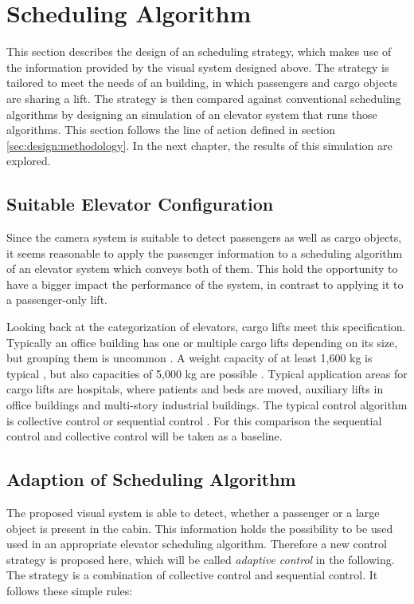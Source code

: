 \section{Scheduling Algorithm}
This section describes the design of an scheduling strategy, 
which makes use of the information provided by the visual system designed above.
The strategy is tailored to meet the needs of an building, in which passengers and cargo objects are sharing a lift.
The strategy is then compared against conventional scheduling algorithms by designing an simulation of an elevator system that runs those algorithms.
This section follows the line of action defined in section \ref{sec:design:methodology}.
In the next chapter, the results of this simulation are explored.

\subsection{Suitable Elevator Configuration}
Since the camera system is suitable to detect passengers as well as cargo objects,
it seems reasonable to apply the passenger information 
to a scheduling algorithm of an elevator system which conveys both of them.
This hold the opportunity to have a bigger impact the performance of the system, 
in contrast to applying it to a passenger-only lift.

Looking back at the categorization of elevators, cargo lifts meet this specification.
Typically an office building has one or multiple cargo lifts depending on its size,
but grouping them is uncommon \autocite[][p.~167]{barney2016handbook}.
A weight capacity of at least 1,600 kg is typical \autocite[][p.~167]{barney2016handbook},
but also capacities of 5,000 kg are possible \autocite[][]{kone2017overview}.
Typical application areas for cargo lifts are hospitals, where patients and beds are moved,
auxiliary lifts in office buildings and multi-story industrial buildings.
The typical control algorithm is collective control or sequential control \autocite[][pp.~238,~244]{barney2016handbook}.
For this comparison the sequential control and collective control will be taken as a baseline.

\subsection{Adaption of Scheduling Algorithm}
The proposed visual system is able to detect, whether a passenger or a large object is present in the cabin.
This information holds the possibility to be used used in an appropriate elevator scheduling algorithm.
Therefore a new control strategy is proposed here, which will be called \emph{adaptive control} in the following. 
The strategy is a combination of collective control and sequential control.
It follows these simple rules:


